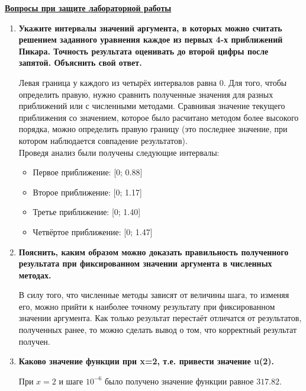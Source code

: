 \underline{\textbf{Вопросы при защите лабораторной работы}}\\

\begin{enumerate}
\item \textbf{Укажите интервалы значений аргумента, в которых можно считать решением заданного уравнения каждое из первых 4-х приближений Пикара. Точность результата оценивать до второй цифры после запятой. Объяснить свой ответ.}

Левая граница у каждого из четырёх интервалов равна 0. Для того, чтобы определить правую, нужно сравнить полученные значения для разных приближений или с численными методами. Сравнивая значение текущего приближения со значением, которое было расчитано методом более высокого порядка, можно определить правую границу (это последнее значение, при котором наблюдается совпадение результатов).\\

Проведя анализ были получены следующие интервалы:
\begin{itemize}
	\item Первое приближение: 	 [0; 0.88]
	\item Второе приближение:    [0; 1.17]
	\item Третье приближение: 	 [0; 1.40]
	\item Четвёртое приближение: [0; 1.47]
\end{itemize}

\item \textbf{Пояснить, каким образом можно доказать правильность полученного результата при фиксированном значении аргумента в численных методах.}

В силу того, что численные методы зависят от величины шага, то изменяя его, можно прийти к наиболее точному результату при фиксированном значении аргумента. Как только результат перестаёт отличатся от результатов, полученных ранее, то можно сделать вывод о том, что корректный результат получен.

\item \textbf{Каково значение функции при x=2, т.е. привести значение u(2).}

При $x = 2$ и шаге $10^{-6}$ было получено значение функции равное $317.82$.
\end{enumerate}